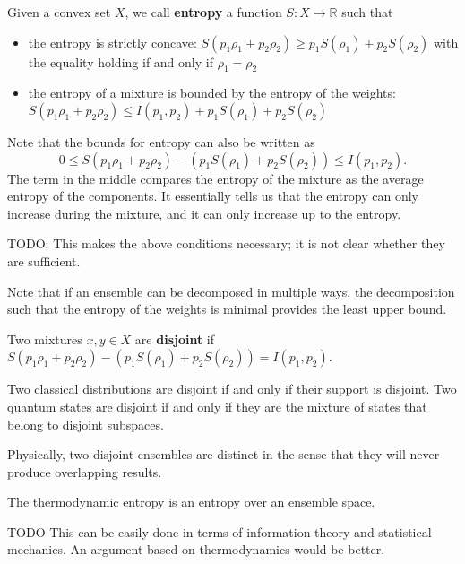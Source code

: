 \documentclass[11pt]{article}
\begin{document}
\begin{defn}
	Given a convex set $X$, we call \textbf{entropy} a function $S : X \to \mathbb{R}$ such that
	\begin{itemize}
		\item the entropy is strictly concave: $S(p_1\rho_1 + p_2 \rho_2) \geq p_1 S(\rho_1) + p_2 S(\rho_2)$ with the equality holding if and only if $\rho_1 = \rho_2$
		\item the entropy of a mixture is bounded by the entropy of the weights: $S(p_1\rho_1 + p_2 \rho_2) \leq I(p_1, p_2) + p_1 S(\rho_1) + p_2 S(\rho_2)$
	\end{itemize}
\end{defn}

\begin{remark}
	Note that the bounds for entropy can also be written as
	$$ 0 \leq S(p_1\rho_1 + p_2 \rho_2) - (p_1 S(\rho_1) + p_2 S(\rho_2)) \leq I(p_1, p_2).$$
	The term in the middle compares the entropy of the mixture as the average entropy of the components. It essentially tells us that the entropy can only increase during the mixture, and it can only increase up to the entropy.
	
	TODO: This makes the above conditions necessary; it is not clear whether they are sufficient.
	
	Note that if an ensemble can be decomposed in multiple ways, the decomposition such that the entropy of the weights is minimal provides the least upper bound.
\end{remark}

\begin{defn}
	Two mixtures $x, y \in X$ are \textbf{disjoint} if $S(p_1\rho_1 + p_2 \rho_2) - (p_1 S(\rho_1) + p_2 S(\rho_2)) = I(p_1, p_2)$.
\end{defn}

\begin{remark}
	Two classical distributions are disjoint if and only if their support is disjoint. Two quantum states are disjoint if and only if they are the mixture of states that belong to disjoint subspaces.
	
	Physically, two disjoint ensembles are distinct in the sense that they will never produce overlapping results.
\end{remark}

\begin{prop}
	The thermodynamic entropy is an entropy over an ensemble space.
\end{prop}
\begin{justification}
	TODO This can be easily done in terms of information theory and statistical mechanics. An argument based on thermodynamics would be better.
\end{justification}
\end{document}
